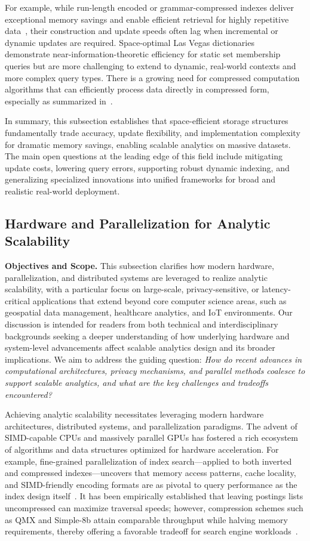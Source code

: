 \documentclass[sigconf]{acmart}
\begin{document}
For example, while run-length encoded or grammar-compressed indexes deliver exceptional memory savings and enable efficient retrieval for highly repetitive data~\cite{ref80,ref81}, their construction and update speeds often lag when incremental or dynamic updates are required. Space-optimal Las Vegas dictionaries~\cite{ref82} demonstrate near-information-theoretic efficiency for static set membership queries but are more challenging to extend to dynamic, real-world contexts and more complex query types. There is a growing need for compressed computation algorithms that can efficiently process data directly in compressed form, especially as summarized in~\cite{ref118}.

In summary, this subsection establishes that space-efficient storage structures fundamentally trade accuracy, update flexibility, and implementation complexity for dramatic memory savings, enabling scalable analytics on massive datasets. The main open questions at the leading edge of this field include mitigating update costs, lowering query errors, supporting robust dynamic indexing, and generalizing specialized innovations into unified frameworks for broad and realistic real-world deployment.

\subsection{Hardware and Parallelization for Analytic Scalability}

\textbf{Objectives and Scope.} This subsection clarifies how modern hardware, parallelization, and distributed systems are leveraged to realize analytic scalability, with a particular focus on large-scale, privacy-sensitive, or latency-critical applications that extend beyond core computer science areas, such as geospatial data management, healthcare analytics, and IoT environments. Our discussion is intended for readers from both technical and interdisciplinary backgrounds seeking a deeper understanding of how underlying hardware and system-level advancements affect scalable analytics design and its broader implications. We aim to address the guiding question: \textit{How do recent advances in computational architectures, privacy mechanisms, and parallel methods coalesce to support scalable analytics, and what are the key challenges and tradeoffs encountered?}

Achieving analytic scalability necessitates leveraging modern hardware architectures, distributed systems, and parallelization paradigms. The advent of SIMD-capable CPUs and massively parallel GPUs has fostered a rich ecosystem of algorithms and data structures optimized for hardware acceleration. For example, fine-grained parallelization of index search—applied to both inverted and compressed indexes—uncovers that memory access patterns, cache locality, and SIMD-friendly encoding formats are as pivotal to query performance as the index design itself~\cite{ref16,ref18,ref32,ref49,ref94,ref96}. It has been empirically established that leaving postings lists uncompressed can maximize traversal speeds; however, compression schemes such as QMX and Simple-8b attain comparable throughput while halving memory requirements, thereby offering a favorable tradeoff for search engine workloads~\cite{ref94}.
\end{document}
